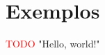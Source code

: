 \section{Exemplos}


\begin{frame}{\insertsection}
  \textcolor{red}{TODO} "Hello, world!"
\end{frame}
